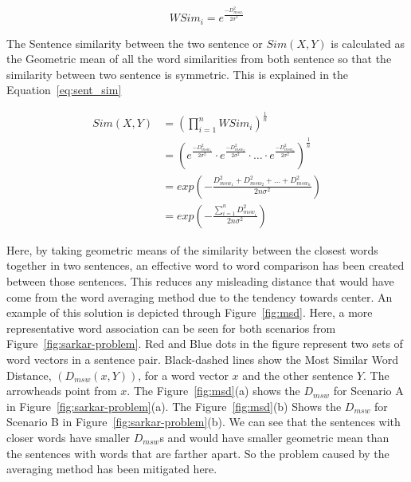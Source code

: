 \begin{equation}\label{eq:wsim}
    WSim_i = e^{\frac{-D_{msw_i}^2}{2\sigma^2}}
\end{equation}

The Sentence similarity between the two sentence or $Sim(X,Y)$ is calculated as the Geometric
mean of all the word similarities from both sentence so that the similarity between two sentence is symmetric.
This is explained in the Equation~\ref{eq:sent_sim}

\begin{equation}\label{eq:sent_sim}
    \begin{split}
        Sim(X,Y)
        &=  \left(
                \prod_{i=1}^nWSim_i
            \right)^{\frac{1}{n}}\\
        &=  \left(
                e^{\frac{-D_{msw_1}^2}{2\sigma^2}}\cdot
                e^{\frac{-D_{msw_2}^2}{2\sigma^2}}\cdot
                    \ldots \cdot
                e^{\frac{-D_{msw_n}^2}{2\sigma^2}}
            \right)^\frac{1}{n}\\
        &=  exp\left(
                -\frac{D_{msw_1}^2+D_{msw_2}^2+\ldots+D_{msw_n}^2}{2n\sigma^2}
            \right)\\
        &=  exp\left(
                -\frac{\sum_{i=1}^nD_{msw_i}^2}{2n\sigma^2}
            \right)
    \end{split}
\end{equation}

Here, by taking geometric means of the similarity between the closest words together in two sentences,
an effective word to word comparison has been created between those sentences.
This reduces any misleading distance that would have come from the word averaging method due to
the tendency towards center.
An example of this solution is depicted through Figure~\ref{fig:msd}.
Here, a more representative word association can be seen for both scenarios from Figure~\ref{fig:sarkar-problem}.
Red and Blue dots in the figure represent two sets of word vectors in a sentence pair.
Black-dashed lines show the Most Similar Word Distance, $(D_{msw}(x,Y))$, for a word vector $x$ and the other sentence $Y$.
The arrowheads point from $x$.
The Figure~\ref{fig:msd}(a) shows the $D_{msw}$ for Scenario A in Figure~\ref{fig:sarkar-problem}(a).
The Figure~\ref{fig:msd}(b) Shows the $D_{msw}$ for Scenario B in Figure~\ref{fig:sarkar-problem}(b).
We can see that the sentences with closer words have smaller $D_{msw}$s and would have smaller geometric mean
than the sentences with words that are farther apart.
So the problem caused by the averaging method has been mitigated here.\\

